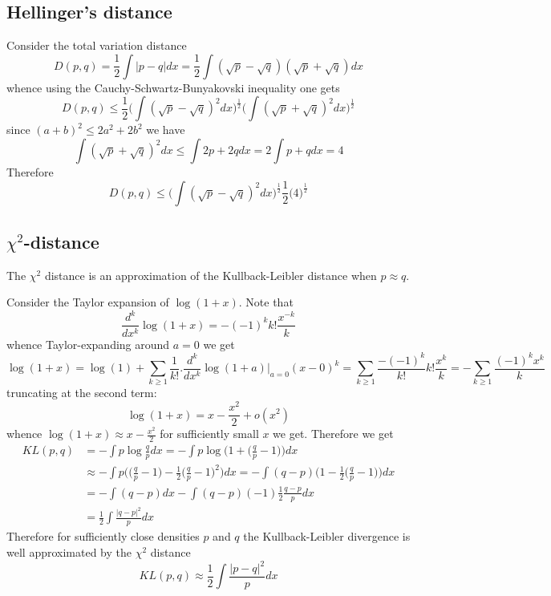 \documentclass[a4paper]{article}
\begin{document}
\subsection{Hellinger's distance} %
\label{sub:hellinger_s_distance}

Consider the total variation distance
\[D(p,q) = \frac{1}{2}\int |p-q| dx = \frac{1}{2}\int (\sqrt{p}-\sqrt{q})(\sqrt{p}+\sqrt{q}) dx\]
whence using the Cauchy-Schwartz-Bunyakovski inequality one gets
\[D(p,q) \leq \frac{1}{2}\Big(\int (\sqrt{p}-\sqrt{q})^2dx\Big)^\frac{1}{2}\Big(\int (\sqrt{p}+\sqrt{q})^2dx\Big)^\frac{1}{2}\]
since $(a+b)^2\leq 2 a^2 + 2 b^2$ we have
\[\int (\sqrt{p}+\sqrt{q})^2dx \leq \int 2p+2q dx = 2 \int p+q dx = 4\]
Therefore
\[D(p,q) \leq \Big(\int (\sqrt{p}-\sqrt{q})^2dx\Big)^\frac{1}{2} \frac{1}{2}\Big(4\Big)^\frac{1}{2}\]


\subsection{$\chi^2$-distance} %
\label{sub:chi2_distance}

The $\chi^2$ distance is an approximation of the Kullback-Leibler distance when $p\approx q$.

Consider the Taylor expansion of $\log(1+x)$. Note that 
\[\frac{d^k}{dx^k} \log(1+x) = -(-1)^kk!\frac{x^{-k}}{k}\]
whence Taylor-expanding around $a=0$ we get
\[\log(1+x) = \log(1) + \sum_{k\geq1} \frac{1}{k!}\bigg.\frac{d^k}{dx^k} \log(1+a)\bigg\rvert_{a=0} (x-0)^k = \sum_{k\geq1} \frac{-(-1)^k}{k!}k!\frac{x^k}{k} = -\sum_{k\geq1} \frac{(-1)^kx^k}{k}\]
truncating at the second term:
\[\log(1+x) = x - \frac{x^2}{2} + o(x^2) \]
whence $\log(1+x)\approx x-\frac{x^2}{2}$ for sufficiently small $x$ we get.
Therefore we get
\begin{align*}
	KL(p,q) &= -\int p\log\frac{q}{p}dx = -\int p \log \Big(1+\big(\frac{q}{p}-1\big)\Big) dx \\
	& \approx -\int p \Big(\big(\frac{q}{p}-1\big) - \frac{1}{2} \big(\frac{q}{p}-1\big)^2 \Big) dx = -\int (q-p) \Big(1 - \frac{1}{2} \big(\frac{q}{p}-1\big) \Big) dx \\
	& = -\int (q-p) dx - \int (q-p) (-1) \frac{1}{2} \frac{q-p}{p} dx\\
	& = \frac{1}{2}\int \frac{|q-p|^2}{p} dx
\end{align*}
Therefore for sufficiently close densities $p$ and $q$ the Kullback-Leibler divergence is well approximated by the $\chi^2$ distance
\[KL(p,q) \approx \frac{1}{2}\int \frac{|p-q|^2}{p}dx\]
\end{document}
